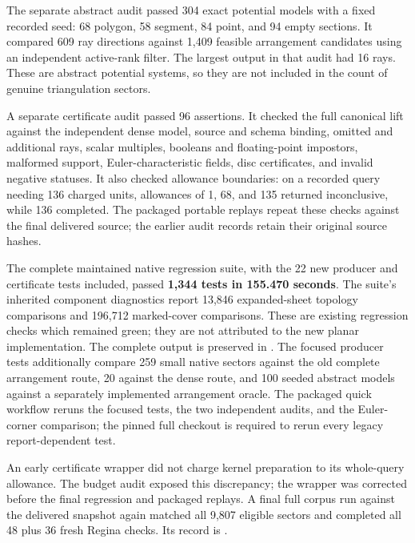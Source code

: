
The separate abstract audit passed 304 exact potential models with a fixed
recorded seed: 68 polygon, 58 segment, 84 point, and 94 empty sections.
It compared 609 ray directions against 1,409 feasible arrangement
candidates using an independent active-rank filter. The largest output in
that audit had 16 rays. These are abstract potential systems, so they are
not included in the count of genuine triangulation sectors.

A separate certificate audit passed 96 assertions. It checked the full
canonical lift against the independent dense model, source and schema
binding, omitted and additional rays, scalar multiples, booleans and
floating-point impostors, malformed support, Euler-characteristic fields,
disc certificates, and invalid negative statuses. It also checked allowance
boundaries: on a recorded query needing 136 charged units, allowances of
1, 68, and 135 returned inconclusive, while 136 completed. The packaged
portable replays repeat these checks against the final delivered source;
the earlier audit records retain their original source hashes.

The complete maintained native regression suite, with the 22 new producer
and certificate tests included, passed \textbf{1,344 tests in 155.470 seconds}.
The suite's inherited component diagnostics report 13,846 expanded-sheet
topology comparisons and 196,712 marked-cover comparisons. These are
existing regression checks which remained green; they are not attributed
to the new planar implementation. The complete output is preserved in
. The focused producer tests additionally
compare 259 small native sectors against the old complete arrangement
route, 20 against the dense route, and 100 seeded abstract models against
a separately implemented arrangement oracle. The packaged quick workflow
reruns the focused tests, the two independent audits, and the Euler-corner
comparison; the pinned full
checkout is required to rerun every legacy report-dependent test.

An early certificate wrapper did not charge kernel preparation to its
whole-query allowance. The budget audit exposed this discrepancy; the
wrapper was corrected before the final regression and packaged replays.
A final full corpus run against the delivered snapshot again matched all
9,807 eligible sectors and completed all 48 plus 36 fresh Regina checks.
Its record is .
